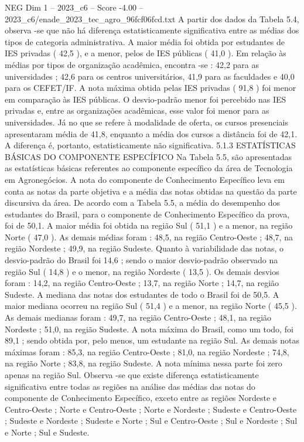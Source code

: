 \begin{textsample}{NEG Dim 1 – 2023\_c6 – Score -4.00 – 2023\_c6/enade\_2023\_tec\_agro\_96fcf06fcd.txt}
A partir dos dados da Tabela 5.4, observa -se que não há diferença estatisticamente significativa entre as médias dos tipos de categoria administrativa.
A maior média foi obtida por estudantes de IES privadas ( 42,5 ), e a menor, pelos de IES públicas ( 41,0 ).
Em relação às médias por tipos de organização acadêmica, encontra -se : 42,2 para as universidades ; 42,6 para os centros universitários, 41,9 para as faculdades e 40,0 para os CEFET/IF.
A nota máxima obtida pelas IES privadas ( 91,8 ) foi menor em comparação às IES públicas.
O desvio-padrão menor foi percebido nas IES privadas e, entre as organizações acadêmicas, esse valor foi menor para as universidades.
Já no que se refere à modalidade de oferta, os cursos presenciais apresentaram média de 41,8, enquanto a média dos cursos a distância foi de 42,1.
A diferença é, portanto, estatisticamente não significativa. 5.1.3 ESTATÍSTICAS BÁSICAS DO COMPONENTE ESPECÍFICO Na Tabela 5.5, são apresentadas as estatísticas básicas referentes ao componente específico da área de Tecnologia em Agronegócios.
A nota do componente de Conhecimento Específico leva em conta as notas da parte objetiva e a média das notas obtidas na questão da parte discursiva da área.
De acordo com a Tabela 5.5, a média do desempenho dos estudantes do Brasil, para o componente de Conhecimento Específico da prova, foi de 50,1.
A maior média foi obtida na região Sul ( 51,1 ) e a menor, na região Norte ( 47,0 ).
As demais médias foram : 48,5, na região Centro-Oeste ; 48,7, na região Nordeste ; 49,9, na região Sudeste.
Quanto à variabilidade das notas, o desvio-padrão do Brasil foi 14,6 ; sendo o maior desvio-padrão observado na região Sul ( 14,8 ) e o menor, na região Nordeste ( 13,5 ).
Os demais desvios foram : 14,2, na região Centro-Oeste ; 13,7, na região Norte ; 14,7, na região Sudeste.
A mediana das notas dos estudantes de todo o Brasil foi de 50,5.
A maior mediana ocorreu na região Sul ( 51,4 ) e a menor, na região Norte ( 45,5 ).
As demais medianas foram : 49,7, na região Centro-Oeste ; 48,1, na região Nordeste ; 51,0, na região Sudeste.
A nota máxima do Brasil, como um todo, foi 89,1 ; sendo obtida por, pelo menos, um estudante na região Sul.
As demais notas máximas foram : 85,3, na região Centro-Oeste ; 81,0, na região Nordeste ; 74,8, na região Norte ; 83,8, na região Sudeste.
A nota mínima nessa parte foi zero apenas na região Sul.
Observa -se que existe diferença estatisticamente significativa entre todas as regiões na análise das médias das notas do componente de Conhecimento Específico, exceto entre as regiões Nordeste e Centro-Oeste ; Norte e Centro-Oeste ; Norte e Nordeste ; Sudeste e Centro-Oeste ; Sudeste e Nordeste ; Sudeste e Norte ; Sul e Centro-Oeste ; Sul e Nordeste ; Sul e Norte ; Sul e Sudeste.

\end{textsample}
